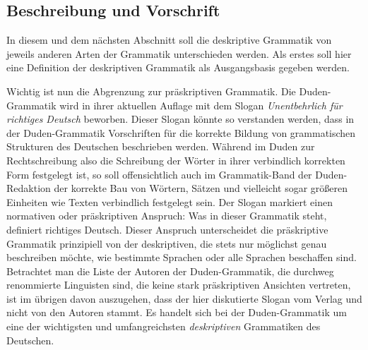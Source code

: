 \label{sec:deskriptivnormativ}

\subsection{Beschreibung und Vorschrift}

In diesem und dem nächsten Abschnitt soll die deskriptive Grammatik von jeweils anderen Arten der Grammatik unterschieden werden.
Als erstes soll hier eine Definition der deskriptiven Grammatik als Ausgangsbasis gegeben werden.


Wichtig ist nun die Abgrenzung zur präskriptiven Grammatik.
Die Du\-den-Gram\-ma\-tik \citep{Duden8} wird in ihrer aktuellen Auflage mit dem Slogan \textit{Unentbehrlich für richtiges Deutsch} beworben.
Dieser Slogan könnte so verstanden werden, dass in der Du\-den-Gram\-ma\-tik Vorschriften für die korrekte Bildung von grammatischen Strukturen des Deutschen beschrieben werden.
Während im Duden zur Rechtschreibung also die Schreibung der Wörter in ihrer verbindlich korrekten Form festgelegt ist, so soll offensichtlich auch im Grammatik-Band der Duden-Redaktion der korrekte Bau von Wörtern, Sätzen und vielleicht sogar größeren Einheiten wie Texten verbindlich festgelegt sein.
Der Slogan markiert einen normativen oder präskriptiven Anspruch:
Was in dieser Grammatik steht, definiert richtiges Deutsch.
Dieser Anspruch unterscheidet die präskriptive Grammatik prinzipiell von der deskriptiven, die stets nur möglichst genau beschreiben möchte, wie bestimmte Sprachen oder alle Sprachen beschaffen sind.
Betrachtet man die Liste der Autoren der Duden-Grammatik, die durchweg renommierte Linguisten sind, die keine stark präskriptiven Ansichten vertreten, ist im übrigen davon auszugehen, dass der hier diskutierte Slogan vom Verlag und nicht von den Autoren stammt. 
Es handelt sich bei der Duden-Grammatik um eine der wichtigsten und umfangreichsten \textit{deskriptiven} Grammatiken des Deutschen.


